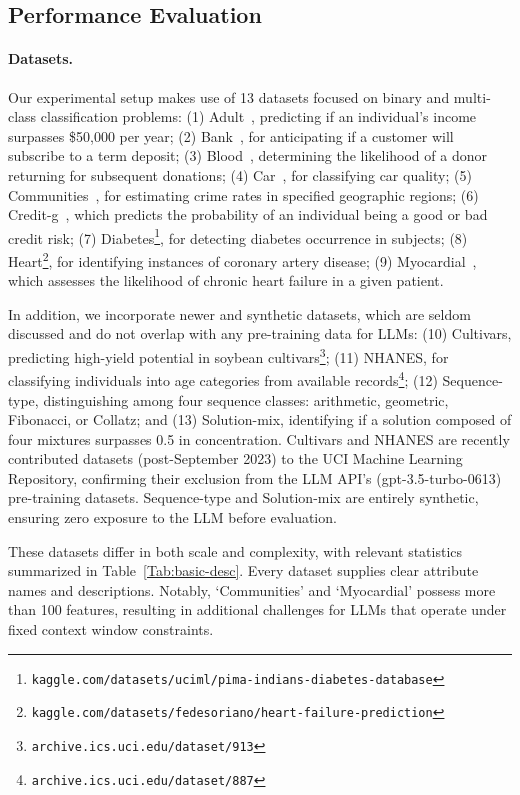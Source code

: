 \subsection{Performance Evaluation}
\paragraph{Datasets.}
Our experimental setup makes use of 13 datasets focused on binary and multi-class classification problems: (1) Adult~\cite{asuncion2007uci}, predicting if an individual’s income surpasses \$50,000 per year; (2) Bank~\cite{moro2014data}, for anticipating if a customer will subscribe to a term deposit; (3) Blood~\cite{yeh2009knowledge}, determining the likelihood of a donor returning for subsequent donations; (4) Car~\cite{kadra2021well}, for classifying car quality; (5) Communities~\cite{misc_communities_and_crime_183}, for estimating crime rates in specified geographic regions; (6) Credit-g~\cite{kadra2021well}, which predicts the probability of an individual being a good or bad credit risk; (7) Diabetes\footnote{\texttt{kaggle.com/datasets/uciml/pima-indians-diabetes-database}}, for detecting diabetes occurrence in subjects; (8) Heart\footnote{\texttt{kaggle.com/datasets/fedesoriano/heart-failure-prediction}}, for identifying instances of coronary artery disease; (9) Myocardial~\cite{misc_myocardial_infarction_complications_579}, which assesses the likelihood of chronic heart failure in a given patient.

In addition, we incorporate newer and synthetic datasets, which are seldom discussed and do not overlap with any pre-training data for LLMs: (10) Cultivars, predicting high-yield potential in soybean cultivars\footnote{\texttt{archive.ics.uci.edu/dataset/913}}; (11) NHANES, for classifying individuals into age categories from available records\footnote{\texttt{archive.ics.uci.edu/dataset/887}}; (12) Sequence-type, distinguishing among four sequence classes: arithmetic, geometric, Fibonacci, or Collatz; and (13) Solution-mix, identifying if a solution composed of four mixtures surpasses 0.5 in concentration. Cultivars and NHANES are recently contributed datasets (post-September 2023) to the UCI Machine Learning Repository, confirming their exclusion from the LLM API’s (gpt-3.5-turbo-0613) pre-training datasets. Sequence-type and Solution-mix are entirely synthetic, ensuring zero exposure to the LLM before evaluation.

These datasets differ in both scale and complexity, with relevant statistics summarized in Table~\ref{Tab:basic-desc}. Every dataset supplies clear attribute names and descriptions. Notably, `Communities' and `Myocardial' possess more than 100 features, resulting in additional challenges for LLMs that operate under fixed context window constraints.

